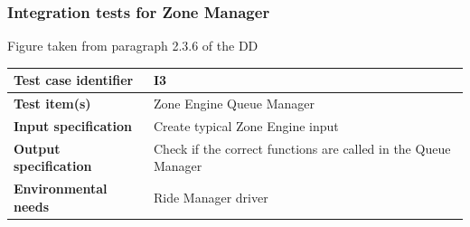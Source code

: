 \documentclass[a4paper,11pt]{report} %
\begin{document}
		\subsubsection{Integration tests for Zone Manager} \label{sec:3.1.2}
		\begin{minipage}{\linewidth}
		\end{minipage}
		\begin{center}
			Figure taken from paragraph 2.3.6 of the DD
		\end{center} 
		\begin{center}
			\renewcommand{\arraystretch}{1.2}
			\setlength{\tabcolsep}{24pt}
			\begin{tabular}{ l  p{9cm}}\hline
				\textbf{Test case identifier} & I3\\\hline
				\textbf{Test item(s)} & Zone Engine \textrightarrow Queue Manager\\\hline
				\textbf{Input specification} & Create typical Zone Engine input \\\hline
				\textbf{Output specification} & Check if the correct functions are called in the Queue Manager\\\hline
				\textbf{Environmental needs} & Ride Manager driver\\\hline
			\end{tabular}
		\end{center}				

		\pagebreak
\end{document}
